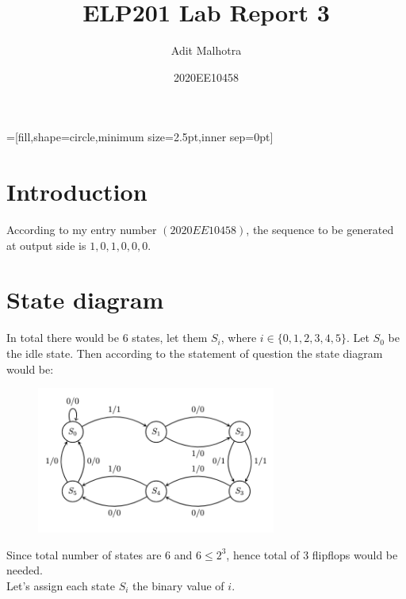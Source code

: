 \documentclass[a4paper]{article}
\title{ELP201 Lab Report 3}
\author{Adit Malhotra}
\date{2020EE10458}
\begin{document}
\maketitle
{}=[fill,shape=circle,minimum size=2.5pt,inner sep=0pt]
\section{Introduction}
According to my entry number $(2020EE10458)$, the sequence to be generated at output side is $1,0,1,0,0,0$. 
\section{State diagram}
In total there would be 6 states, let them $S_{i}$, where $i \in \{0,1,2,3,4,5\}$. Let $S_{0}$ be the idle state. Then according to the statement of question the state diagram would be:
\begin{figure}[H]
  \centering
  \includegraphics[width=0.7\textwidth]{states.png}
\end{figure}

Since total number of states are 6 and $6\leqslant 2^{3}$, hence total of 3 flipflops would be needed.\\
Let's assign each state $S_{i}$ the binary value of $i$.
\pagebreak
\end{document}
